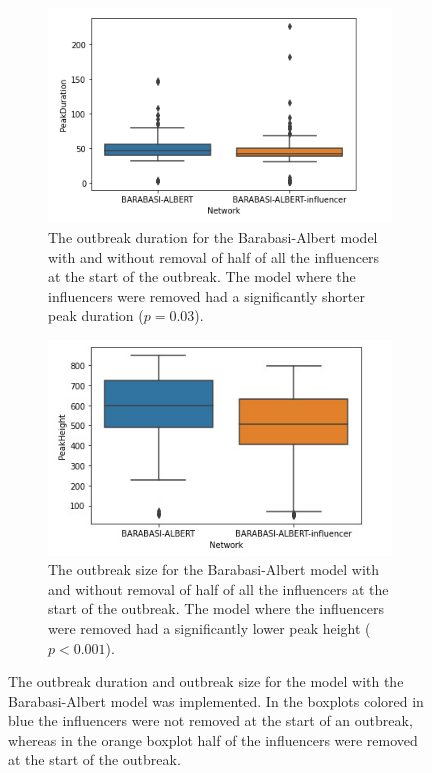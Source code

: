 \documentclass[10pt]{article}
\begin{document}
    \begin{figure}[h!]
        \centering
        \begin{subfigure}[b]{.45\linewidth}
            \includegraphics[width=\textwidth]{pictures/Results/influencer_removal_duration.jpg}
            \caption{The outbreak duration for the Barabasi-Albert model with and without removal of half of all the influencers at the start of the outbreak. The model where the influencers were removed had a significantly shorter peak duration ($p= 0.03$).}
            \label{fig:ba_boxb}
        \end{subfigure}\hspace{5mm}
        \begin{subfigure}[b]{.45\linewidth}
            \includegraphics[width=\textwidth]{pictures/Results/influencer_removal.jpg}
            \caption{The outbreak size for the Barabasi-Albert model with and without removal of half of all the influencers at the start of the outbreak. The model where the influencers were removed had a significantly lower peak height ($p < 0.001$).}
            \label{fig:ba_boxa}
        \end{subfigure}
        \captionsetup{width = 0.95\linewidth}
        \caption{The outbreak duration and outbreak size for the model with the Barabasi-Albert model was implemented. In the boxplots colored in blue the influencers were not removed at the start of an outbreak, whereas in the orange boxplot half of the influencers were removed at the start of the outbreak.}
        \label{fig:inf_comp}
    \end{figure}
\end{document}

